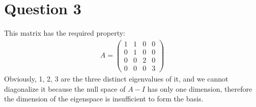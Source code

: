 \section*{Question 3}
This matrix has the required property:
\begin{eqnarray*}
    A = \left(\begin{array}{cccc}
      1 & 1 & 0 & 0 \\
      0 & 1 & 0 & 0 \\
      0 & 0 & 2 & 0 \\
      0 & 0 & 0 & 3
    \end{array}\right)
\end{eqnarray*}
Obviously, 1, 2, 3 are the three distinct eigenvalues of it, and we cannot diagonalize it because the null space of $ A - I $ has only one dimension, therefore the dimension of the eigenspace is insufficient to form the basis.
